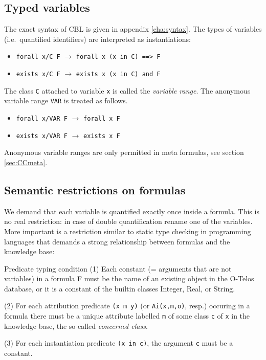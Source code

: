 \subsection{Typed variables}
The exact syntax of CBL is given in appendix \ref{cha:syntax}.
The types of variables
(i.e.\ quantified identifiers) are interpreted as instantiations:

\begin{itemize}
\item {\tt forall x/C F}  \hfill $\rightarrow$  \hfill {\tt forall x (x in C) ==> F} \hfill \hbox{}
\item {\tt exists x/C F}  \hfill $\rightarrow$  \hfill {\tt exists x (x in C) and F} \hfill \hbox{}
\end{itemize}

The class {\tt C} attached to variable {\tt x} is called the {\em variable range}.
The anonymous variable range {\tt VAR} is treated as follows.

\begin{itemize}
\item {\tt forall x/VAR F}  \hfill $\rightarrow$  \hfill {\tt forall x F} \hfill \hbox{}
\item {\tt exists x/VAR F}  \hfill $\rightarrow$  \hfill {\tt exists x F} \hfill \hbox{}
\end{itemize}

Anonymous variable ranges are only permitted in meta formulas, see section \ref{sec:CCmeta}. 

\subsection{Semantic restrictions on formulas}
\label{sec:SemFormula}

We demand that each variable is quantified exactly once inside a formula.
This is no real restriction: in case of double quantification rename one of
the variables. More important is a restriction similar to static type
checking in programming languages that demands a strong relationship
between formulas and the knowledge base:

\begin{axiom}{Predicate typing condition}
(1) Each constant (= arguments that are not variables) in a formula F must be
the name of an existing object in the O-Telos database, or it is a
constant of the builtin classes Integer, Real, or String. 

(2) For each attribution predicate {\tt (x m y)} (or {\tt Ai(x,m,o)}, resp.) occuring in a formula there must be a
unique attribute labelled {\tt m} of some class {\tt c} of {\tt x} in the knowledge base, 
the so-called {\em concerned class}.

(3) For each instantiation predicate {\tt (x in c)}, the argument {\tt c} must be a constant.
\end{axiom}

